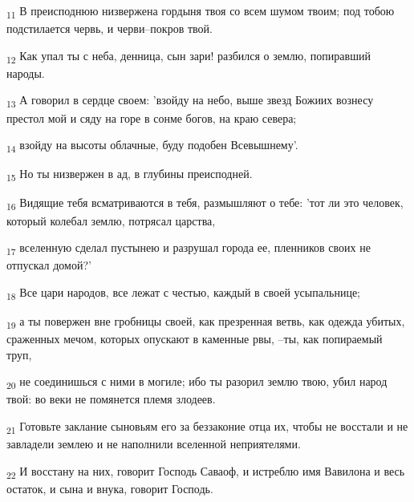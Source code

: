 \begin{tcolorbox}
\textsubscript{11} В преисподнюю низвержена гордыня твоя со всем шумом твоим; под тобою подстилается червь, и черви--покров твой.
\end{tcolorbox}
\begin{tcolorbox}
\textsubscript{12} Как упал ты с неба, денница, сын зари! разбился о землю, попиравший народы.
\end{tcolorbox}
\begin{tcolorbox}
\textsubscript{13} А говорил в сердце своем: 'взойду на небо, выше звезд Божиих вознесу престол мой и сяду на горе в сонме богов, на краю севера;
\end{tcolorbox}
\begin{tcolorbox}
\textsubscript{14} взойду на высоты облачные, буду подобен Всевышнему'.
\end{tcolorbox}
\begin{tcolorbox}
\textsubscript{15} Но ты низвержен в ад, в глубины преисподней.
\end{tcolorbox}
\begin{tcolorbox}
\textsubscript{16} Видящие тебя всматриваются в тебя, размышляют о тебе: 'тот ли это человек, который колебал землю, потрясал царства,
\end{tcolorbox}
\begin{tcolorbox}
\textsubscript{17} вселенную сделал пустынею и разрушал города ее, пленников своих не отпускал домой?'
\end{tcolorbox}
\begin{tcolorbox}
\textsubscript{18} Все цари народов, все лежат с честью, каждый в своей усыпальнице;
\end{tcolorbox}
\begin{tcolorbox}
\textsubscript{19} а ты повержен вне гробницы своей, как презренная ветвь, как одежда убитых, сраженных мечом, которых опускают в каменные рвы, --ты, как попираемый труп,
\end{tcolorbox}
\begin{tcolorbox}
\textsubscript{20} не соединишься с ними в могиле; ибо ты разорил землю твою, убил народ твой: во веки не помянется племя злодеев.
\end{tcolorbox}
\begin{tcolorbox}
\textsubscript{21} Готовьте заклание сыновьям его за беззаконие отца их, чтобы не восстали и не завладели землею и не наполнили вселенной неприятелями.
\end{tcolorbox}
\begin{tcolorbox}
\textsubscript{22} И восстану на них, говорит Господь Саваоф, и истреблю имя Вавилона и весь остаток, и сына и внука, говорит Господь.
\end{tcolorbox}

